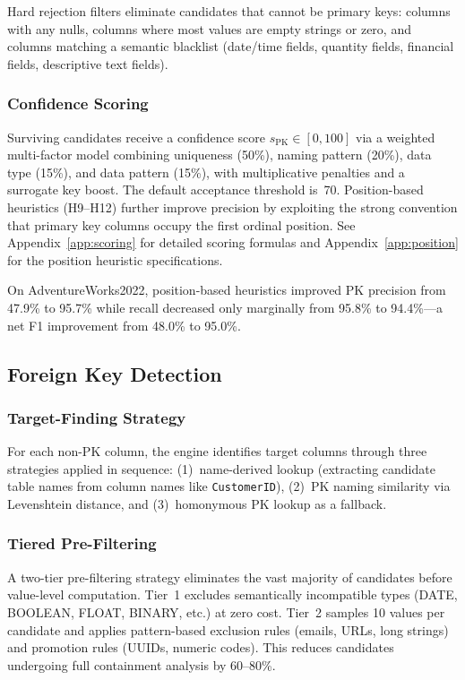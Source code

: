\documentclass[sigconf, nonacm]{acmart}
\begin{document}
Hard rejection filters eliminate candidates that cannot be primary keys: columns with any nulls, columns where most values are empty strings or zero, and columns matching a semantic blacklist (date/time fields, quantity fields, financial fields, descriptive text fields).

\subsubsection{Confidence Scoring}

Surviving candidates receive a confidence score $s_{\mathrm{PK}} \in [0, 100]$ via a weighted multi-factor model combining uniqueness (50\%), naming pattern (20\%), data type (15\%), and data pattern (15\%), with multiplicative penalties and a surrogate key boost. The default acceptance threshold is~70. Position-based heuristics (H9--H12) further improve precision by exploiting the strong convention that primary key columns occupy the first ordinal position. See Appendix~\ref{app:scoring} for detailed scoring formulas and Appendix~\ref{app:position} for the position heuristic specifications.

On AdventureWorks2022, position-based heuristics improved PK precision from 47.9\% to 95.7\% while recall decreased only marginally from 95.8\% to 94.4\%---a net F1 improvement from 48.0\% to 95.0\%.

\subsection{Foreign Key Detection}

\subsubsection{Target-Finding Strategy}

For each non-PK column, the engine identifies target columns through three strategies applied in sequence: (1)~name-derived lookup (extracting candidate table names from column names like \texttt{CustomerID}), (2)~PK naming similarity via Levenshtein distance, and (3)~homonymous PK lookup as a fallback.

\subsubsection{Tiered Pre-Filtering}

A two-tier pre-filtering strategy eliminates the vast majority of candidates before value-level computation. Tier~1 excludes semantically incompatible types (DATE, BOOLEAN, FLOAT, BINARY, etc.) at zero cost. Tier~2 samples 10 values per candidate and applies pattern-based exclusion rules (emails, URLs, long strings) and promotion rules (UUIDs, numeric codes). This reduces candidates undergoing full containment analysis by 60--80\%.
\end{document}
